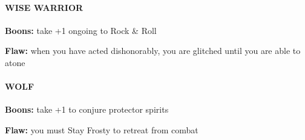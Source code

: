 \documentclass[oneside,10pt]{article}
\begin{document}
\begin{multicols}{2}
\paragraph{WISE WARRIOR}
\begin{adjustwidth*}{.5cm}{.5cm}
\textbf{Boons:} take +1 ongoing to Rock \& Roll

\textbf{Flaw:} when you have acted dishonorably, you are glitched until you are able to atone
\end{adjustwidth*}


\paragraph{WOLF}
\begin{adjustwidth*}{.5cm}{.5cm}
\textbf{Boons:} take +1 to conjure protector spirits

\textbf{Flaw:} you must Stay Frosty to retreat from combat
\end{adjustwidth*}

\end{multicols}

\end{document}
